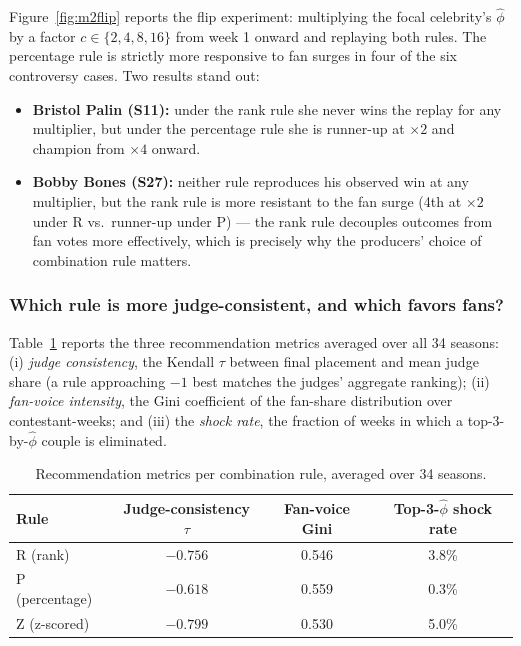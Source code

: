 \documentclass[10pt]{article}
\begin{document}
Figure~\ref{fig:m2flip} reports the flip experiment: multiplying the focal celebrity's
$\hat\phi$ by a factor $c \in \{2, 4, 8, 16\}$ from week 1 onward and replaying both
rules. The percentage rule is strictly more responsive to fan surges in four of the six
controversy cases. Two results stand out:
\begin{itemize}[itemsep=1pt]
\item \textbf{Bristol Palin (S11):} under the rank rule she never wins the replay for any
multiplier, but under the percentage rule she is runner-up at $\times 2$ and champion from
$\times 4$ onward.
\item \textbf{Bobby Bones (S27):} neither rule reproduces his observed win at any
multiplier, but the rank rule is more resistant to the fan surge (4th at $\times 2$
under R vs.\ runner-up under P) --- the rank rule decouples outcomes from fan votes more
effectively, which is precisely why the producers' choice of combination rule matters.
\end{itemize}

\subsubsection{Which rule is more judge-consistent, and which favors fans?}

Table~\ref{tab:rule-metrics} reports the three recommendation metrics averaged over all
34 seasons: (i) \emph{judge consistency}, the Kendall $\tau$ between final placement and
mean judge share (a rule approaching $-1$ best matches the judges' aggregate ranking);
(ii) \emph{fan-voice intensity}, the Gini coefficient of the fan-share distribution over
contestant-weeks; and (iii) the \emph{shock rate}, the fraction of weeks in which a
top-3-by-$\hat\phi$ couple is eliminated.

\begin{table}[H]
\centering
\caption{Recommendation metrics per combination rule, averaged over 34 seasons.}
\label{tab:rule-metrics}
\begin{tabular}{lccc}
\toprule
Rule & Judge-consistency $\tau$ & Fan-voice Gini & Top-3-$\hat\phi$ shock rate \\
\midrule
R (rank)       & $-0.756$ & 0.546 & 3.8\% \\
P (percentage) & $-0.618$ & 0.559 & 0.3\% \\
Z (z-scored)   & $-0.799$ & 0.530 & 5.0\% \\
\bottomrule
\end{tabular}
\end{table}
\end{document}
